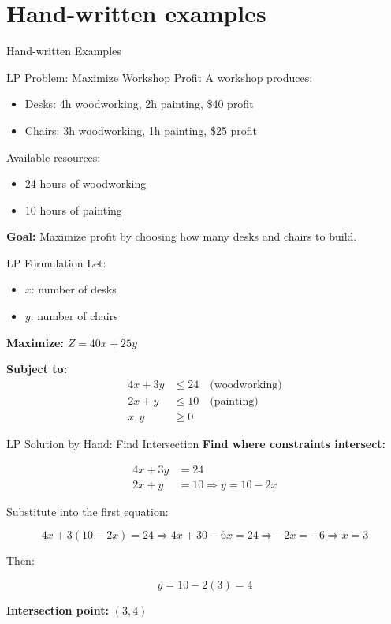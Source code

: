 \documentclass{purdue-slide}
\begin{document}
\section{Hand-written examples}

\begin{titleframe}{Hand-written Examples}

\end{titleframe}

\begin{frame}{LP Problem: Maximize Workshop Profit}
	A workshop produces:
	\begin{itemize}
		\item Desks: 4h woodworking, 2h painting, \$40 profit
		\item Chairs: 3h woodworking, 1h painting, \$25 profit
	\end{itemize}

	Available resources:
	\begin{itemize}
		\item 24 hours of woodworking
		\item 10 hours of painting
	\end{itemize}

	\textbf{Goal:} Maximize profit by choosing how many desks and chairs to build.
\end{frame}

\begin{frame}{LP Formulation}
	Let:
	\begin{itemize}
		\item \(x\): number of desks
		\item \(y\): number of chairs
	\end{itemize}

	\textbf{Maximize: } \(Z = 40x + 25y\)

	\textbf{Subject to:}
	\[
		\begin{aligned}
			4x + 3y &\leq 24 \quad \text{(woodworking)} \\
			2x + y &\leq 10 \quad \text{(painting)} \\
			x, y &\geq 0
		\end{aligned}
	\]
\end{frame}

\begin{frame}{LP Solution by Hand: Find Intersection}
	\textbf{Find where constraints intersect:}

	\[
		\begin{aligned}
			4x + 3y &= 24 \\
			2x + y &= 10 \Rightarrow y = 10 - 2x
		\end{aligned}
	\]

	Substitute into the first equation:

	\[
		4x + 3(10 - 2x) = 24 \Rightarrow 4x + 30 - 6x = 24 \Rightarrow -2x = -6 \Rightarrow x = 3
	\]

	Then:

	\[
		y = 10 - 2(3) = 4
	\]

	\textbf{Intersection point: } \((3, 4)\)
\end{frame}
\end{document}
